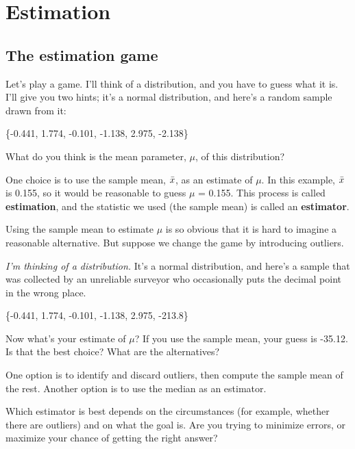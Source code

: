 \documentclass[12pt]{book}
\begin{document}
\chapter{Estimation}
\label{estimation}

\section{The estimation game}

Let's play a game.  I'll think of a distribution, and you have to guess
what it is.  I'll give you two hints; it's a
normal distribution, and here's a random sample drawn from it:

\{-0.441, 1.774, -0.101, -1.138, 2.975, -2.138\}

What do you think is the mean parameter, $\mu$, of this distribution?

One choice is to use the sample mean, $\bar{x}$, as an estimate of $\mu$.
In this example, $\bar{x}$ is 0.155, so it would
be reasonable to guess $\mu$ = 0.155.
This process is called {\bf estimation}, and the statistic we used
(the sample mean) is called an {\bf estimator}.

Using the sample mean to estimate $\mu$ is so obvious that it is hard
to imagine a reasonable alternative.  But suppose we change the game by
introducing outliers.

{\em I'm thinking of a distribution.}  It's a normal distribution, and
here's a sample that was collected by an unreliable surveyor who
occasionally puts the decimal point in the wrong place.

\{-0.441, 1.774, -0.101, -1.138, 2.975, -213.8\}

Now what's your estimate of $\mu$?  If you use the sample mean, your
guess is -35.12.  Is that the best choice?  What are the alternatives?

One option is to identify and discard outliers, then compute the sample
mean of the rest.  Another option is to use the median as an estimator.

Which estimator is best depends on the circumstances (for example,
whether there are outliers) and on what the goal is.  Are you
trying to minimize errors, or maximize your chance of getting the
right answer?
\end{document}
